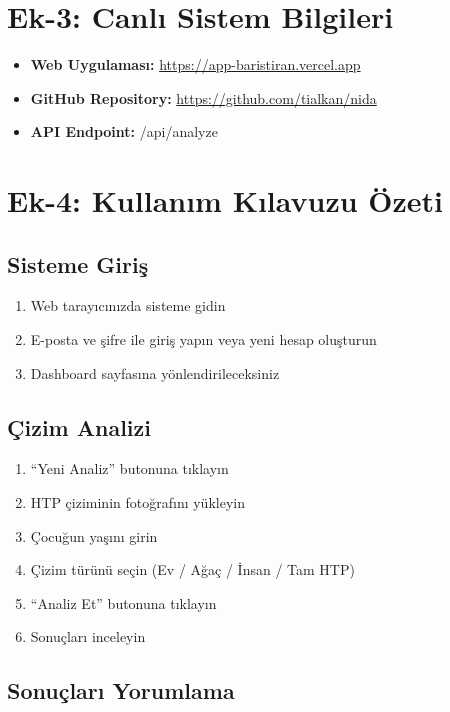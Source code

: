 \section{Ek-3: Canlı Sistem Bilgileri}

\begin{itemize}
  \item \textbf{Web Uygulaması:} \url{https://app-baristiran.vercel.app}
  \item \textbf{GitHub Repository:} \url{https://github.com/tialkan/nida}
  \item \textbf{API Endpoint:} /api/analyze
\end{itemize}

\section{Ek-4: Kullanım Kılavuzu Özeti}

\subsection{Sisteme Giriş}

\begin{enumerate}
  \item Web tarayıcınızda sisteme gidin
  \item E-posta ve şifre ile giriş yapın veya yeni hesap oluşturun
  \item Dashboard sayfasına yönlendirileceksiniz
\end{enumerate}

\subsection{Çizim Analizi}

\begin{enumerate}
  \item ``Yeni Analiz'' butonuna tıklayın
  \item HTP çiziminin fotoğrafını yükleyin
  \item Çocuğun yaşını girin
  \item Çizim türünü seçin (Ev / Ağaç / İnsan / Tam HTP)
  \item ``Analiz Et'' butonuna tıklayın
  \item Sonuçları inceleyin
\end{enumerate}

\subsection{Sonuçları Yorumlama}

